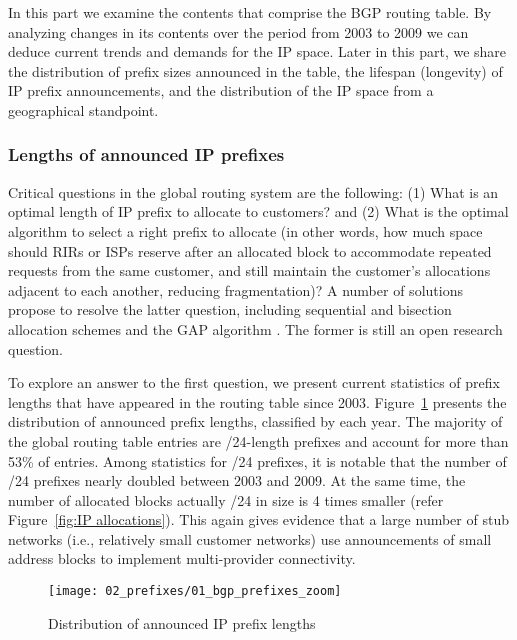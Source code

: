 In this part we examine the contents that comprise the BGP routing table. By
analyzing changes in its contents over the period from 2003 to 2009 we can
deduce current trends and demands for the IP space. Later in this part, we
share the distribution of prefix sizes announced in the table, the lifespan
(longevity) of IP prefix announcements, and the distribution of the IP space
from a geographical standpoint.

\subsubsection{Lengths of announced IP prefixes}

Critical questions in the global routing system are the following: (1) What is
an optimal length of IP prefix to allocate to customers? and (2) What is the
optimal algorithm to select a right prefix to allocate (in other words, how
much space should RIRs or ISPs reserve after an allocated block to accommodate
repeated requests from the same customer, and still maintain the customer's
allocations adjacent to each another, reducing fragmentation)? A number of
solutions propose to resolve the latter question, including sequential and
bisection allocation schemes and the GAP algorithm
\cite{Wang:2007:Reduce-IP-Address}. The former is still an open research
question.

To explore an answer to the first question, we present current statistics of
prefix lengths that have appeared in the routing table since 2003.
 Figure~\ref{fig:bgp prefix distribution} presents the distribution of
announced prefix lengths, classified by each year. The majority of the global
routing table entries are /24-length prefixes and account for more than 53\% of
entries. Among statistics for /24 prefixes, it is notable that the number of
/24 prefixes nearly doubled between 2003 and 2009. At the same time, the number
of allocated blocks actually /24 in size is 4 times smaller (refer
Figure~\ref{fig:IP allocations}). This again gives evidence that a large number
of stub networks (i.e., relatively small customer networks) use announcements
of small address blocks to implement multi-provider connectivity.

\begin{figure}[htbp]
	\centering
		\texttt{[image: 02\_prefixes/01\_bgp\_prefixes\_zoom]}
	\caption{Distribution of announced IP prefix lengths}
	\label{fig:bgp prefix distribution}
\end{figure}

